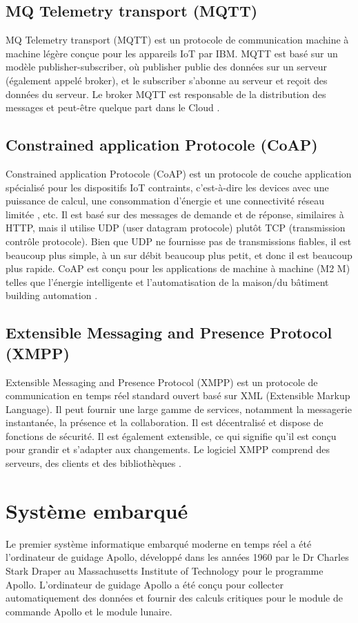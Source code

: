 \subsection{MQ Telemetry transport (MQTT)}
MQ Telemetry transport (MQTT) est un protocole de communication machine à machine légère conçue pour les appareils IoT par IBM. MQTT est basé sur un modèle publisher-subscriber, où publisher publie des données sur un serveur (également appelé broker), et le subscriber s'abonne au serveur et reçoit des données du serveur. Le broker MQTT est responsable de la distribution des messages et peut-être quelque part dans le Cloud \cite{lampkin2012building,yassein2017internet}. 
\subsection{Constrained application Protocole (CoAP)}
Constrained application Protocole (CoAP)  est un protocole de couche application spécialisé pour les dispositifs IoT contraints, c'est-à-dire les devices avec une puissance de calcul, une consommation d'énergie et une connectivité réseau limitée \cite{shelby2014constrained}, etc. Il est basé sur des messages de demande et de réponse, similaires à HTTP, mais il utilise UDP (user datagram protocole) plutôt TCP (transmission contrôle protocole). Bien que UDP ne fournisse pas de transmissions fiables, il est beaucoup plus simple, à un sur débit beaucoup plus petit, et donc il est beaucoup plus rapide. CoAP est conçu pour les applications de machine à machine (M2 M) telles que l'énergie intelligente et l'automatisation de la maison/du bâtiment building automation \cite{bormann2012coap}.
\subsection{Extensible Messaging and Presence Protocol (XMPP)}
Extensible Messaging and Presence Protocol (XMPP) est un protocole de communication en temps réel standard ouvert basé sur XML (Extensible Markup Language). Il peut fournir une large gamme de services, notamment la messagerie instantanée, la présence et la collaboration. Il est décentralisé et dispose de fonctions de sécurité. Il est également extensible, ce qui signifie qu'il est conçu pour grandir et s'adapter aux changements. Le logiciel XMPP comprend des serveurs, des clients et des bibliothèques \cite{saint2004extensible,bendel2013service}.
\section{Système embarqué}
Le premier système informatique embarqué moderne en temps réel a été l'ordinateur de guidage Apollo, développé dans les années 1960 par le Dr Charles Stark Draper au Massachusetts Institute of Technology pour le programme Apollo. L'ordinateur de guidage Apollo a été conçu pour collecter automatiquement des données et fournir des calculs critiques pour le module de commande Apollo et le module lunaire.

